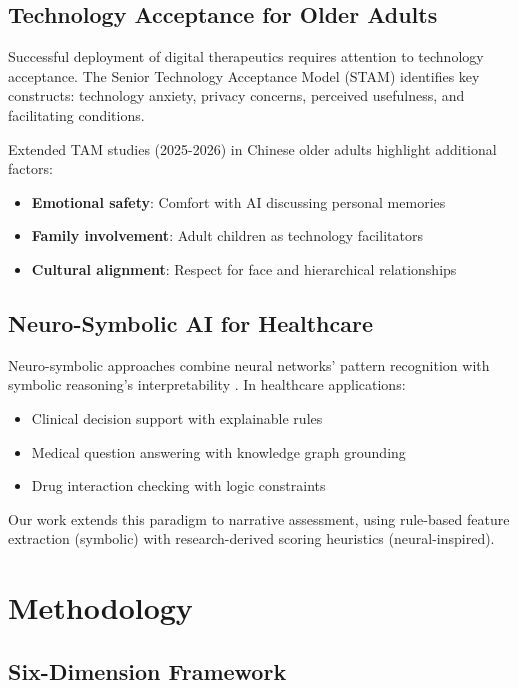 \documentclass{article}
\begin{document}
\subsection{Technology Acceptance for Older Adults}

Successful deployment of digital therapeutics requires attention to technology acceptance. The Senior Technology Acceptance Model (STAM) \cite{mitzner2024} identifies key constructs: technology anxiety, privacy concerns, perceived usefulness, and facilitating conditions.

Extended TAM studies (2025-2026) in Chinese older adults highlight additional factors:
\begin{itemize}
    \item \textbf{Emotional safety}: Comfort with AI discussing personal memories \cite{huang2026}
    \item \textbf{Family involvement}: Adult children as technology facilitators \cite{zhang2026}
    \item \textbf{Cultural alignment}: Respect for face and hierarchical relationships \cite{liu2025}
\end{itemize}

\subsection{Neuro-Symbolic AI for Healthcare}

Neuro-symbolic approaches combine neural networks' pattern recognition with symbolic reasoning's interpretability \cite{garcez2025}. In healthcare applications:
\begin{itemize}
    \item Clinical decision support with explainable rules \cite{wang2026}
    \item Medical question answering with knowledge graph grounding \cite{chen2026}
    \item Drug interaction checking with logic constraints \cite{kumar2025}
\end{itemize}

Our work extends this paradigm to narrative assessment, using rule-based feature extraction (symbolic) with research-derived scoring heuristics (neural-inspired).

\section{Methodology}

\subsection{Six-Dimension Framework}
\end{document}
